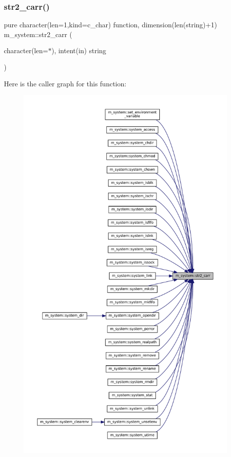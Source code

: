 \subsubsection{\texorpdfstring{str2\+\_\+carr()}{str2\_carr()}}
{\footnotesize\ttfamily pure character(len=1,kind=c\+\_\+char) function, dimension(len(string)+1) m\+\_\+system\+::str2\+\_\+carr (\begin{DoxyParamCaption}\item[{character(len=$\ast$), intent(in)}]{string }\end{DoxyParamCaption})\hspace{0.3cm}{\ttfamily [private]}}

Here is the caller graph for this function\+:\nopagebreak
\begin{figure}[H]
\begin{center}
\leavevmode
\includegraphics[height=550pt]{namespacem__system_a58bb591b5b9fefec3960a28361aae07a_icgraph}
\end{center}
\end{figure}
\mbox{\label{namespacem__system_a4c1c906730e61629a8277e1daeda90f6}} 
